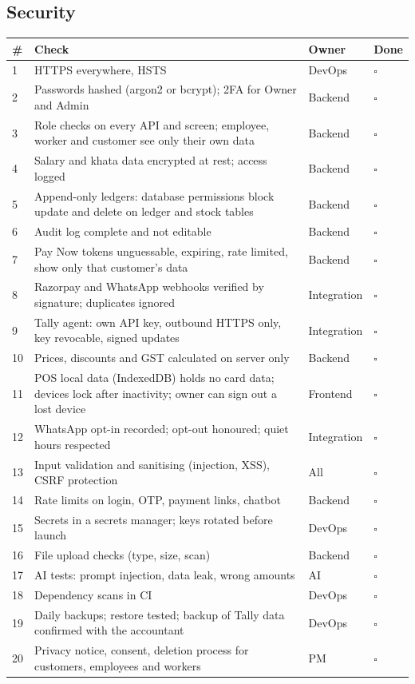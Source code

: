 \documentclass[11pt,a4paper]{article}
\newcommand{\chk}{$\square$}
\newcommand{\hdr}{\rowcolor{hdrgray}\bfseries}
\begin{document}
\subsection{Security}
\begin{longtable}{L{0.8cm}L{10.4cm}L{3.4cm}L{1.4cm}}
\hdr \# & Check & Owner & Done \\  & HTTPS everywhere, HSTS & DevOps & \chk \\
2 & Passwords hashed (argon2 or bcrypt); 2FA for Owner and Admin & Backend & \chk \\
3 & Role checks on every API and screen; employee, worker and customer see only their own data & Backend & \chk \\
4 & Salary and khata data encrypted at rest; access logged & Backend & \chk \\
5 & Append-only ledgers: database permissions block update and delete on ledger and stock tables & Backend & \chk \\
6 & Audit log complete and not editable & Backend & \chk \\
7 & Pay Now tokens unguessable, expiring, rate limited, show only that customer's data & Backend & \chk \\
8 & Razorpay and WhatsApp webhooks verified by signature; duplicates ignored & Integration & \chk \\
9 & Tally agent: own API key, outbound HTTPS only, key revocable, signed updates & Integration & \chk \\
10 & Prices, discounts and GST calculated on server only & Backend & \chk \\
11 & POS local data (IndexedDB) holds no card data; devices lock after inactivity; owner can sign out a lost device & Frontend & \chk \\
12 & WhatsApp opt-in recorded; opt-out honoured; quiet hours respected & Integration & \chk \\
13 & Input validation and sanitising (injection, XSS), CSRF protection & All & \chk \\
14 & Rate limits on login, OTP, payment links, chatbot & Backend & \chk \\
15 & Secrets in a secrets manager; keys rotated before launch & DevOps & \chk \\
16 & File upload checks (type, size, scan) & Backend & \chk \\
17 & AI tests: prompt injection, data leak, wrong amounts & AI & \chk \\
18 & Dependency scans in CI & DevOps & \chk \\
19 & Daily backups; restore tested; backup of Tally data confirmed with the accountant & DevOps & \chk \\
20 & Privacy notice, consent, deletion process for customers, employees and workers & PM & \chk \\
\end{longtable}
\end{document}

